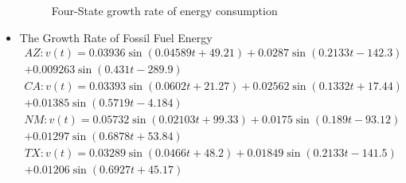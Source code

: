 \begin{itemize}
\begin{figure}[htbp]
		\caption{Four-State growth rate of energy consumption	}                      %
		\label{fig:GrowthRateRenewable}                                       %
	\end{figure}
   \item The Growth Rate of Fossil Fuel Energy\\
   \begin{multline}
   AZ:v(t)=0.03936\sin(0.04589t+49.21)+0.0287\sin(0.2133t-142.3)\\+0.009263\sin(0.431t-289.9)%
   \end{multline}
   \begin{multline}
   CA:v(t)=0.03393\sin(0.0602t+21.27)+0.02562\sin(0.1332t+17.44)\\+0.01385\sin(0.5719t-4.184)%
   \end{multline}
   \begin{multline}
   NM:v(t)=0.05732\sin(0.02103t+99.33)+0.0175\sin(0.189t-93.12)\\+0.01297\sin(0.6878t+53.84)%
   \end{multline}
   \begin{multline}
   TX:v(t)=0.03289\sin(0.0466t+48.2)+0.01849\sin(0.2133t-141.5)\\+0.01206\sin(0.6927t+45.17)%

\end{multline}
\end{itemize}
